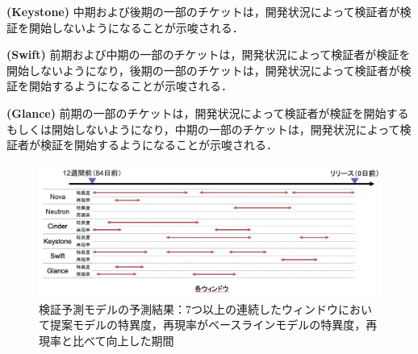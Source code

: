 \documentclass[11pt]{jreport}
\begin{document}
\textbf{ (Keystone) }中期および後期の一部のチケットは，開発状況によって検証者が検証を開始しないようになることが示唆される．

\textbf{ (Swift) }前期および中期の一部のチケットは，開発状況によって検証者が検証を開始しないようになり，後期の一部のチケットは，開発状況によって検証者が検証を開始するようになることが示唆される．

\textbf{ (Glance) }前期の一部のチケットは，開発状況によって検証者が検証を開始するもしくは開始しないようになり，中期の一部のチケットは，開発状況によって検証者が検証を開始するようになることが示唆される．



\begin{figure}[t]
\begin{center}
    \includegraphics[width=1.0\textwidth]{Uenaka_fig/RQ2_result/review_sperec_window.pdf}
    \caption{検証予測モデルの予測結果：7つ以上の連続したウィンドウにおいて提案モデルの特異度，再現率がベースラインモデルの特異度，再現率と比べて向上した期間}
    \label{fig:review_sperec_window}
\end{center}
\end{figure}
\end{document}
